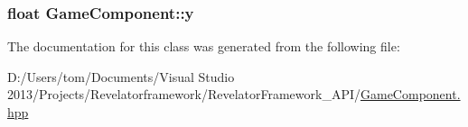 \hypertarget{class_game_component_a8a40aa75eff388a7da06668d3d2fe87c}{
\subsubsection[{y}]{\setlength{\rightskip}{0pt plus 5cm}float Game\-Component\-::y}}\label{class_game_component_a8a40aa75eff388a7da06668d3d2fe87c}


The documentation for this class was generated from the following file\-:\begin{DoxyCompactItemize}
\item 
D\-:/\-Users/tom/\-Documents/\-Visual Studio 2013/\-Projects/\-Revelatorframework/\-Revelator\-Framework\-\_\-\-A\-P\-I/\hyperlink{_game_component_8hpp}{Game\-Component.\-hpp}\end{DoxyCompactItemize}
